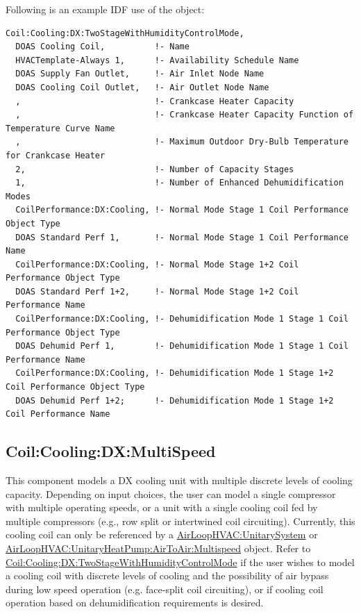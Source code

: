 Following is an example IDF use of the object:

\begin{lstlisting}
Coil:Cooling:DX:TwoStageWithHumidityControlMode,
  DOAS Cooling Coil,          !- Name
  HVACTemplate-Always 1,      !- Availability Schedule Name
  DOAS Supply Fan Outlet,     !- Air Inlet Node Name
  DOAS Cooling Coil Outlet,   !- Air Outlet Node Name
  ,                           !- Crankcase Heater Capacity
  ,                           !- Crankcase Heater Capacity Function of Temperature Curve Name
  ,                           !- Maximum Outdoor Dry-Bulb Temperature for Crankcase Heater
  2,                          !- Number of Capacity Stages
  1,                          !- Number of Enhanced Dehumidification Modes
  CoilPerformance:DX:Cooling, !- Normal Mode Stage 1 Coil Performance Object Type
  DOAS Standard Perf 1,       !- Normal Mode Stage 1 Coil Performance Name
  CoilPerformance:DX:Cooling, !- Normal Mode Stage 1+2 Coil Performance Object Type
  DOAS Standard Perf 1+2,     !- Normal Mode Stage 1+2 Coil Performance Name
  CoilPerformance:DX:Cooling, !- Dehumidification Mode 1 Stage 1 Coil Performance Object Type
  DOAS Dehumid Perf 1,        !- Dehumidification Mode 1 Stage 1 Coil Performance Name
  CoilPerformance:DX:Cooling, !- Dehumidification Mode 1 Stage 1+2 Coil Performance Object Type
  DOAS Dehumid Perf 1+2;      !- Dehumidification Mode 1 Stage 1+2 Coil Performance Name
\end{lstlisting}

\subsection{Coil:Cooling:DX:MultiSpeed}\label{coilcoolingdxmultispeed}

This component models a DX cooling unit with multiple discrete levels of cooling capacity. Depending on input choices, the user can model a single compressor with multiple operating speeds, or a unit with a single cooling coil fed by multiple compressors (e.g., row split or intertwined coil circuiting). Currently, this cooling coil can only be referenced by a \hyperref[airloophvacunitarysystem]{AirLoopHVAC:UnitarySystem} or \hyperref[airloophvacunitaryheatpumpairtoairmultispeed]{AirLoopHVAC:UnitaryHeatPump:AirToAir:Multispeed} object. Refer to \hyperref[coilcoolingdxtwostagewithhumiditycontrolmode]{Coil:Cooling:DX:TwoStageWithHumidityControlMode} if the user wishes to model a cooling coil with discrete levels of cooling and the possibility of air bypass during low speed operation (e.g. face-split coil circuiting), or if cooling coil operation based on dehumidification requirements is desired.

